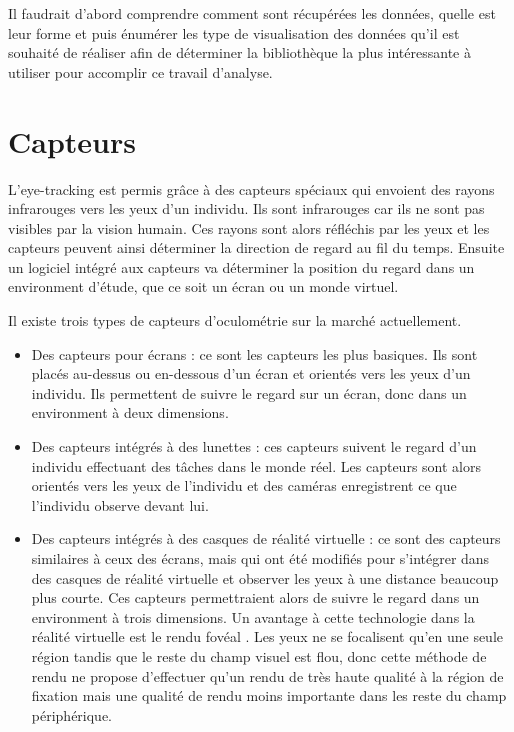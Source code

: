 \documentclass[12pt]{article}
\begin{document}
\bigskip
Il faudrait d'abord comprendre comment sont récupérées les données, quelle est
leur forme et puis énumérer les type de visualisation des données qu'il est
souhaité de réaliser afin de déterminer la bibliothèque la plus intéressante à
utiliser pour accomplir ce travail d'analyse.

\pagebreak


\section{Capteurs}

L'eye-tracking est permis grâce à des capteurs spéciaux qui envoient des rayons
infrarouges vers les yeux d'un individu. Ils sont infrarouges car ils ne sont
pas visibles par la vision humain. Ces rayons sont alors réfléchis par les yeux
et les capteurs peuvent ainsi déterminer la direction de regard au fil du temps.
Ensuite un logiciel intégré aux capteurs va déterminer la position du regard
dans un environment d'étude, que ce soit un écran ou un monde virtuel.

\bigskip
Il existe trois types de capteurs d'oculométrie sur la marché actuellement.
\begin{itemize}
  \item Des capteurs pour écrans : ce sont les capteurs les plus basiques. Ils
        sont placés au-dessus ou en-dessous d'un écran et orientés vers les yeux
        d'un individu. Ils permettent de suivre le regard sur un écran, donc
        dans un environment à deux dimensions.
  \item Des capteurs intégrés à des lunettes : ces capteurs suivent le regard
        d'un individu effectuant des tâches dans le monde réel. Les capteurs
        sont alors orientés vers les yeux de l'individu et des caméras
        enregistrent ce que l'individu observe devant lui.
  \item Des capteurs intégrés à des casques de réalité virtuelle : ce sont des
        capteurs similaires à ceux des écrans, mais qui ont été modifiés pour
        s'intégrer dans des casques de réalité virtuelle et observer les yeux à
        une distance beaucoup plus courte. Ces capteurs permettraient alors de
        suivre le regard dans un environment à trois dimensions. Un avantage à
        cette technologie dans la réalité virtuelle est le rendu fovéal
        \cite{wiki:foveated_rendering}. Les yeux ne se focalisent qu'en une
        seule région tandis que le reste du champ visuel est flou, donc cette
        méthode de rendu ne propose d'effectuer qu'un rendu de très haute
        qualité à la région de fixation mais une qualité de rendu moins
        importante dans les reste du champ périphérique.
\end{itemize}
\end{document}
